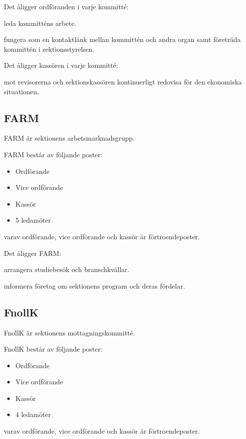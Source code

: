 \documentclass{styrdokument}
\begin{document}
\? Det åligger ordföranden i varje kommitté:
\begin{aligganden}
    \item leda kommitténs arbete.
    \item fungera som en kontaktlänk mellan kommittén och andra organ samt företräda kommittén i sektionsstyrelsen.
\end{aligganden}

\? Det åligger kassören i varje kommitté:
\begin{aligganden}
    \item mot revisorerna och sektionskassören kontinuerligt redovisa för den ekonomiska situationen.
\end{aligganden}

\subsection{FARM}
\? FARM är sektionens arbetsmarknadsgrupp.

\? FARM består av följande poster:
\begin{itemize}
    \item Ordförande
 	\item Vice ordförande
	\item Kassör
	\item 5 ledamöter
\end{itemize}
varav ordförande, vice ordförande och kassör är förtroendeposter.

\? Det åligger FARM:
\begin{aligganden}
    \item arrangera studiebesök och branschkvällar.   
    \item informera företag om sektionens program och deras fördelar.
\end{aligganden}

\subsection{FnollK}
\? FnollK är sektionens mottagningskommitté.

\? FnollK består av följande poster:
\begin{itemize}
    \item Ordförande
	\item Vice ordförande
	\item Kassör
	\item 4 ledamöter
\end{itemize}
varav ordförande, vice ordförande och kassör är förtroendeposter.
		
\end{document}
